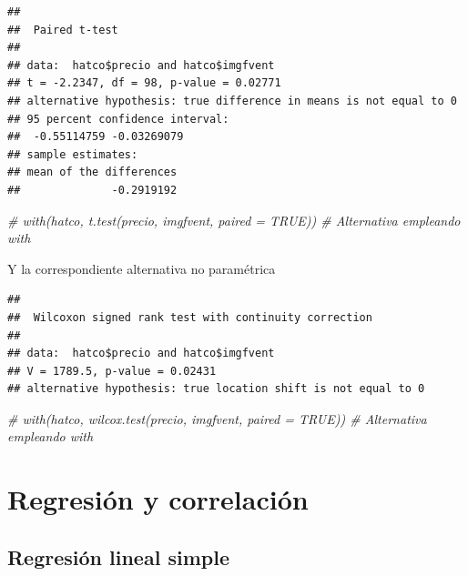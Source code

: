 \documentclass[]{book}
\newenvironment{Shaded}{\begin{snugshade}}{\end{snugshade}}
\newcommand{\KeywordTok}[1]{\textcolor[rgb]{0.13,0.29,0.53}{\textbf{#1}}}
\newcommand{\DataTypeTok}[1]{\textcolor[rgb]{0.13,0.29,0.53}{#1}}
\newcommand{\CommentTok}[1]{\textcolor[rgb]{0.56,0.35,0.01}{\textit{#1}}}
\newcommand{\OtherTok}[1]{\textcolor[rgb]{0.56,0.35,0.01}{#1}}
\newcommand{\OperatorTok}[1]{\textcolor[rgb]{0.81,0.36,0.00}{\textbf{#1}}}
\newcommand{\NormalTok}[1]{#1}
\begin{document}
\begin{verbatim}
## 
##  Paired t-test
## 
## data:  hatco$precio and hatco$imgfvent
## t = -2.2347, df = 98, p-value = 0.02771
## alternative hypothesis: true difference in means is not equal to 0
## 95 percent confidence interval:
##  -0.55114759 -0.03269079
## sample estimates:
## mean of the differences 
##              -0.2919192
\end{verbatim}

\begin{Shaded}
\begin{Highlighting}[]
\CommentTok{# with(hatco, t.test(precio, imgfvent, paired = TRUE)) # Alternativa empleando with}
\end{Highlighting}
\end{Shaded}

Y la correspondiente alternativa no paramétrica

\begin{Shaded}
\end{Shaded}

\begin{verbatim}
## 
##  Wilcoxon signed rank test with continuity correction
## 
## data:  hatco$precio and hatco$imgfvent
## V = 1789.5, p-value = 0.02431
## alternative hypothesis: true location shift is not equal to 0
\end{verbatim}

\begin{Shaded}
\begin{Highlighting}[]
\CommentTok{# with(hatco, wilcox.test(precio, imgfvent, paired = TRUE)) # Alternativa empleando with}
\end{Highlighting}
\end{Shaded}

\section{Regresión y correlación}\label{regresion-y-correlacion}

\subsection{Regresión lineal simple}\label{regresion-lineal-simple}
\end{document}
